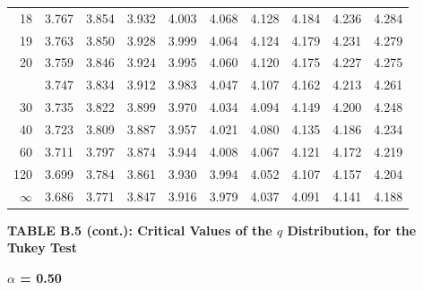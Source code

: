 \documentclass[10pt]{article}
\begin{document}
\begin{longtable}{@{}r!{\vrule width 0.8pt\hspace{0.55em}}rrrrrrrrr@{}}
18 & 3.767 & 3.854 & 3.932 & 4.003 & 4.068 & 4.128 & 4.184 & 4.236 & 4.284 \\
19 & 3.763 & 3.850 & 3.928 & 3.999 & 4.064 & 4.124 & 4.179 & 4.231 & 4.279 \\
20 & 3.759 & 3.846 & 3.924 & 3.995 & 4.060 & 4.120 & 4.175 & 4.227 & 4.275 \\
 & 3.747 & 3.834 & 3.912 & 3.983 & 4.047 & 4.107 & 4.162 & 4.213 & 4.261 \\
30 & 3.735 & 3.822 & 3.899 & 3.970 & 4.034 & 4.094 & 4.149 & 4.200 & 4.248 \\
40 & 3.723 & 3.809 & 3.887 & 3.957 & 4.021 & 4.080 & 4.135 & 4.186 & 4.234 \\
60 & 3.711 & 3.797 & 3.874 & 3.944 & 4.008 & 4.067 & 4.121 & 4.172 & 4.219 \\
120 & 3.699 & 3.784 & 3.861 & 3.930 & 3.994 & 4.052 & 4.107 & 4.157 & 4.204 \\
\addlinespace[0.30em]
$\infty$ & 3.686 & 3.771 & 3.847 & 3.916 & 3.979 & 4.037 & 4.091 & 4.141 & 4.188 \\
\end{longtable}
\newpage
\thispagestyle{empty}
\begin{center}
{\large\bfseries TABLE B.5 (cont.): Critical Values of the $q$ Distribution, for the Tukey Test\par}
\end{center}
{\large\bfseries $\alpha$ = 0.50\par}
\vspace{0.45em}
\small
\end{document}
